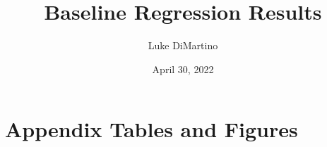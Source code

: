 \documentclass[12pt]{article}
\title{Baseline Regression Results}
\author{Luke DiMartino}
\date{April 30, 2022}
\begin{document}
\maketitle

\setcounter{table}{0}
\renewcommand{\tablename}{Appendix Table}
\renewcommand{\figurename}{Appendix Figure}
\renewcommand{\thetable}{A\arabic{table}}
\setcounter{figure}{0}
\renewcommand{\thefigure}{A\arabic{figure}}

\section{Appendix Tables and Figures}


\newpage

\end{document}
